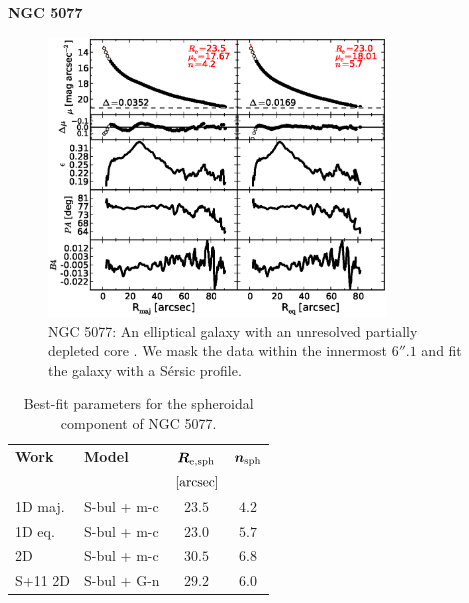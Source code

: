 \documentclass[preprint2]{emulateapj}
\newcommand{\fitfigurewidth}{0.8\textwidth}
\begin{document}
  \clearpage\newpage\noindent
  {\bf NGC 5077 \\}

  \begin{figure}[h]
  \begin{center}
  \includegraphics[width=\fitfigurewidth]{images/n5077_1Dfit.eps}
  \caption{NGC 5077:  
  An elliptical galaxy with an unresolved partially depleted core \citep{trujillo2004coresersicmodel}. 
  We mask the data within the innermost $6''.1$ and fit the galaxy with a S\'ersic profile. }
  \end{center}
  \end{figure}

  \begin{table}[h]
  \small
  \caption{Best-fit parameters for the spheroidal component of NGC 5077.}
  \begin{center}
  \begin{tabular}{llcc}
  \hline
  {\bf Work} & {\bf Model}   & $\bm R_{\rm e,sph}$    & $\bm n_{\rm sph}$ \\
    &  &  $[\rm arcsec]$ & \\
  \hline
  1D maj. & S-bul + m-c & $23.5$  &  $4.2$ \\
  1D eq.  & S-bul + m-c & $23.0$  &  $5.7$ \\
  2D      & S-bul + m-c & $30.5$  &  $6.8$ \\
  \hline
  S+11 2D         & S-bul + G-n & $29.2$  &  $6.0$ \\
  \hline
  \end{tabular}
  \end{center}
  \label{tab:n5077}
  \end{table}
\end{document}

